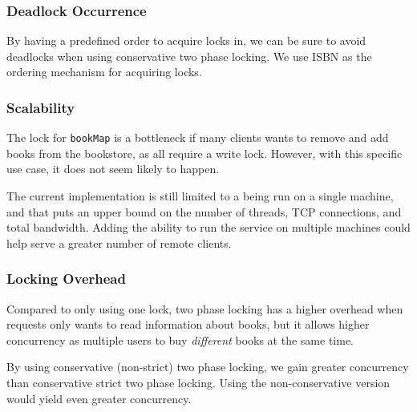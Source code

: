 \documentclass[11pt,a4paper,english]{article}
\begin{document}
\subsubsection{Deadlock Occurrence}

%

By having a predefined order to acquire locks in, we can be sure to avoid
deadlocks when using conservative two phase locking. We use ISBN as the ordering
mechanism for acquiring locks.

\subsubsection{Scalability}

The lock for \texttt{bookMap} is a bottleneck if many clients wants to remove
and add books from the bookstore, as all require a write lock. However, with
this specific use case, it does not seem likely to happen.

The current implementation is still limited to a being run on a single machine,
and that puts an upper bound on the number of threads, TCP connections, and
total bandwidth. Adding the ability to run the service on multiple machines
could help serve a greater number of remote clients.

\subsubsection{Locking Overhead}

Compared to only using one lock, two phase locking has a higher overhead when
requests only wants to read information about books, but it allows higher
concurrency as multiple users to buy \emph{different} books at the same time.

By using conservative (non-strict) two phase locking, we gain greater
concurrency than conservative strict two phase locking. Using the
non-conservative version would yield even greater concurrency.
\end{document}
